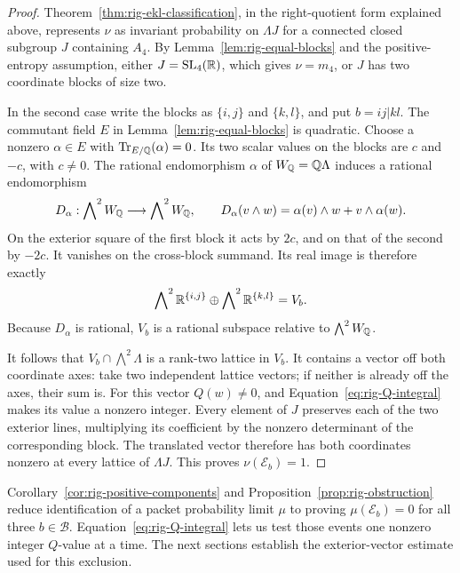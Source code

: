 \begin{proof}
Theorem~\ref{thm:rig-ekl-classification}, in the right-quotient
form explained above, represents \(\nu\) as invariant probability
on \(\Lambda J\) for a connected closed subgroup \(J\) containing
\(A_4\).  By Lemma~\ref{lem:rig-equal-blocks} and the
positive-entropy assumption, either \(J=\mathrm{SL}_4(\mathbb R)\), which
gives \(\nu=m_4\), or \(J\) has two coordinate blocks of size two.

In the second case write the blocks as \(\{i,j\}\) and \(\{k,l\}\),
and put \(b=ij|kl\).  The commutant field \(E\) in
Lemma~\ref{lem:rig-equal-blocks} is quadratic.  Choose a nonzero
\(\alpha\in E\) with \(\operatorname{Tr}_{E/\mathbb Q}(\alpha)=0\).
Its two scalar values on the blocks are \(c\) and \(-c\), with
\(c\ne0\).  The rational endomorphism \(\alpha\) of
\(W_\mathbb Q=\mathbb Q\Lambda\) induces a rational endomorphism
\[
 D_\alpha:\bigwedge\nolimits^2 W_\mathbb Q\longrightarrow
                    \bigwedge\nolimits^2 W_\mathbb Q,\qquad
 D_\alpha(v\wedge w)=\alpha(v)\wedge w+v\wedge\alpha(w).
\]
On the exterior square of the first block it acts by \(2c\), and
on that of the second by \(-2c\).  It vanishes on the cross-block
summand.  Its real image is therefore exactly
\[
 \bigwedge\nolimits^2\mathbb R^{\{i,j\}}
 \oplus \bigwedge\nolimits^2\mathbb R^{\{k,l\}}=V_b.
\]
Because \(D_\alpha\) is rational, \(V_b\) is a rational subspace
relative to \(\bigwedge^2 W_\mathbb Q\).

It follows that \(V_b\cap\bigwedge^2\Lambda\) is a rank-two lattice
in \(V_b\).  It contains a vector off both coordinate axes: take
two independent lattice vectors; if neither is already off the
axes, their sum is.  For this vector \(Q(w)\ne0\), and
Equation~\eqref{eq:rig-Q-integral} makes its value a nonzero integer.
Every element of \(J\) preserves each of the two exterior lines,
multiplying its coefficient by the nonzero determinant of the
corresponding block.  The translated vector therefore has both
coordinates nonzero at every lattice of \(\Lambda J\).
This proves \(\nu(\mathcal E_b)=1\).
\end{proof}

Corollary~\ref{cor:rig-positive-components} and
Proposition~\ref{prop:rig-obstruction} reduce identification of a
packet probability limit \(\mu\) to proving
\(\mu(\mathcal E_b)=0\) for all three \(b\in\mathcal B\).
Equation~\eqref{eq:rig-Q-integral} lets us test those events one
nonzero integer \(Q\)-value at a time.  The next sections establish
the exterior-vector estimate used for this exclusion.
